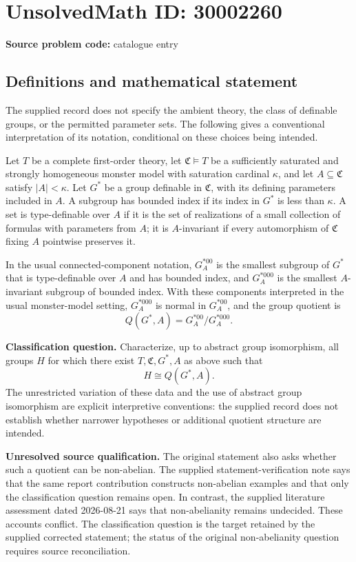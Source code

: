 \documentclass[11pt]{article}
\begin{document}
\section*{UnsolvedMath ID: 30002260}
\textbf{Source problem code:} catalogue entry
\subsection{Definitions and mathematical statement}
The supplied record does not specify the ambient theory, the class of definable groups, or the permitted parameter sets. The following gives a conventional interpretation of its notation, conditional on these choices being intended.

Let \(T\) be a complete first-order theory, let \(\mathfrak C\models T\) be a sufficiently saturated and strongly homogeneous monster model with saturation cardinal \(\kappa\), and let \(A\subseteq\mathfrak C\) satisfy \(|A|<\kappa\). Let \(G^*\) be a group definable in \(\mathfrak C\), with its defining parameters included in \(A\). A subgroup has bounded index if its index in \(G^*\) is less than \(\kappa\). A set is type-definable over \(A\) if it is the set of realizations of a small collection of formulas with parameters from \(A\); it is \(A\)-invariant if every automorphism of \(\mathfrak C\) fixing \(A\) pointwise preserves it.

In the usual connected-component notation, \(G_A^{*00}\) is the smallest subgroup of \(G^*\) that is type-definable over \(A\) and has bounded index, and \(G_A^{*000}\) is the smallest \(A\)-invariant subgroup of bounded index. With these components interpreted in the usual monster-model setting, \(G_A^{*000}\) is normal in \(G_A^{*00}\), and the group quotient is
\[
Q(G^*,A)=G_A^{*00}/G_A^{*000}.
\]

\textbf{Classification question.} Characterize, up to abstract group isomorphism, all groups \(H\) for which there exist \(T,\mathfrak C,G^*,A\) as above such that
\[
H\cong Q(G^*,A).
\]
The unrestricted variation of these data and the use of abstract group isomorphism are explicit interpretive conventions: the supplied record does not establish whether narrower hypotheses or additional quotient structure are intended.

\textbf{Unresolved source qualification.} The original statement also asks whether such a quotient can be non-abelian. The supplied statement-verification note says that the same report contribution constructs non-abelian examples and that only the classification question remains open. In contrast, the supplied literature assessment dated 2026-08-21 says that non-abelianity remains undecided. These accounts conflict. The classification question is the target retained by the supplied corrected statement; the status of the original non-abelianity question requires source reconciliation.
\end{document}
